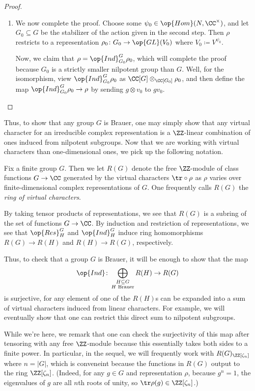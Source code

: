 \documentclass[../thesis.tex]{subfiles}
\begin{document}
\begin{proof}
\begin{enumerate}
		\item We now complete the proof. Choose some $\psi_0\in\op{Hom}(N,\CC^\times)$, and let $G_0\subseteq G$ be the stabilizer of the action given in the second step. Then $\rho$ restricts to a representation $\rho_0\colon G_0\to\op{GL}(V_0)$ where $V_0\coloneqq V^{\psi_0}$.
		
		Now, we claim that $\rho=\op{Ind}_{G_0}^G\rho_0$, which will complete the proof because $G_0$ is a strictly smaller nilpotent group than $G$. Well, for the isomorphism, view $\op{Ind}_{G_0}^G\rho_0$ as $\CC[G]\otimes_{\CC[G_0]}\rho_0$, and then define the map $\op{Ind}_{G_0}^G\rho_0\to\rho$ by sending $g\otimes v_0$ to $gv_0$.
		\qedhere
	\end{enumerate}
\end{proof}
Thus, to show that any group $G$ is Brauer, one may simply show that any virtual character for an irreducible complex representation is a $\ZZ$-linear combination of ones induced from nilpotent subgroups. Now that we are working with virtual characters than one-dimensional ones, we pick up the following notation.
\begin{definition}
	Fix a finite group $G$. Then we let $R(G)$ denote the free $\ZZ$-module of class functions $G\to\CC$ generated by the virtual characters ${\tr}\circ\rho$ as $\rho$ varies over finite-dimensional complex representations of $G$. One frequently calls $R(G)$ the \textit{ring of virtual characters}.
\end{definition}
\begin{remark}
	By taking tensor products of representations, we see that $R(G)$ is a subring of the set of functions $G\to\CC$. By induction and restriction of representations, we see that $\op{Res}^G_H$ and $\op{Ind}^G_H$ induce ring homomorphisms $R(G)\to R(H)$ and $R(H)\to R(G)$, respectively.
\end{remark}
Thus, to check that a group $G$ is Brauer, it will be enough to show that the map
\[\op{Ind}\colon\bigoplus_{\substack{H\subseteq G\\H\text{ Brauer}}}R(H)\to R(G)\]
is surjective, for any element of one of the $R(H)$s can be expanded into a sum of virtual characters induced from linear characters. For example, we will eventually show that one can restrict this direct sum to nilpotent subgroups.
\begin{remark}
	While we're here, we remark that one can check the surjectivity of this map after tensoring with any free $\ZZ$-module because this essentially takes both sides to a finite power. In particular, in the sequel, we will frequently work with $R(G)_{\ZZ[\zeta_n]}$ where $n=\left|G\right|$, which is conveneint because the functions in $R(G)$ output to the ring $\ZZ[\zeta_n]$. (Indeed, for any $g\in G$ and representation $\rho$, because $g^n=1$, the eigenvalues of $g$ are all $n$th roots of unity, so $\tr\rho(g)\in\ZZ[\zeta_n]$.)
\end{remark}
\end{document}
